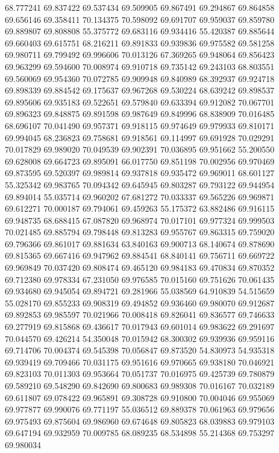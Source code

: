 68.777241
69.837422
69.537434
69.509905
69.867491
69.294867
69.864858
69.656146
69.358411
70.134375
70.598092
69.691707
69.959037
69.859780
69.889807
69.808808
55.375772
69.683116
69.934416
55.420387
69.885644
69.660403
69.615751
68.216211
69.891833
69.939836
69.975582
69.581258
69.980711
69.799492
69.996606
70.013126
67.369265
69.948064
69.856423
69.963299
69.594600
70.008974
69.910718
69.735142
69.243103
68.803551
69.560069
69.954360
70.072785
69.909948
69.840989
68.392937
69.924718
69.898339
69.884542
69.175637
69.967268
69.530224
68.639242
69.898537
69.895606
69.935183
69.522651
69.579840
69.633394
69.912082
70.067701
69.896323
69.848875
69.891598
69.987649
69.849996
68.838909
70.016485
68.696107
70.041490
69.957371
69.918115
69.974649
69.979933
69.810171
69.994045
68.236823
69.758681
69.918561
69.114997
69.691928
70.029291
70.017829
69.989020
70.049539
69.902391
70.036895
69.951662
55.200550
69.628008
69.664723
69.895091
66.017750
69.851198
70.002956
69.970469
69.873595
69.520397
69.989814
69.937818
69.935472
69.969011
68.601127
55.325342
69.983765
70.094342
69.645945
69.803287
69.793122
69.944954
69.894014
55.035714
69.960202
67.681272
70.033337
69.565226
69.969871
69.612271
70.000187
69.794061
69.459263
55.175372
63.882486
69.916115
69.948735
68.688415
67.087820
69.968974
70.017101
69.977324
69.999503
70.021485
69.885794
69.798448
69.813283
69.955767
69.863315
69.759020
69.796366
69.861017
69.881634
63.840163
69.900713
68.140674
69.878690
69.815365
69.667416
69.947962
69.884541
68.840141
69.756711
69.669722
69.969849
70.037420
69.808474
69.465120
69.984183
69.470834
69.870352
69.712380
69.978334
67.231050
69.976585
70.015160
69.751626
70.061435
69.934680
69.945054
69.894721
69.281966
55.038569
64.910839
54.515659
55.028170
69.855233
69.908319
69.494852
69.936460
69.980070
69.912687
69.892853
69.985597
70.021966
70.008418
69.826041
69.836577
69.746633
69.277919
69.815868
69.436617
70.017943
69.601014
69.983622
69.291697
70.044570
69.426214
54.350048
70.015942
68.300302
69.939936
69.959116
69.714706
70.004374
69.545398
70.056847
69.873520
54.830973
54.935318
69.939419
69.709466
70.031175
69.951616
69.970665
69.938180
70.046921
69.823103
70.011303
69.953664
70.051737
70.016975
69.425739
69.780879
69.589210
69.548290
69.842690
69.800683
69.989308
70.016167
70.032189
69.611807
69.078422
69.965891
69.308728
69.910800
70.004046
69.955069
69.977877
69.990076
69.771197
55.036512
69.889378
70.061963
69.979656
69.975493
69.875604
69.986960
69.674648
69.805823
68.039883
69.979103
69.647194
69.932959
70.009785
68.089235
68.534898
55.214368
69.753297
69.980034
